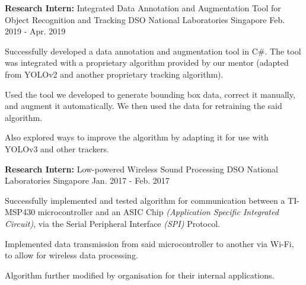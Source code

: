 


\begin{cventries}


\label{computerVisionProject}

\cventry
{
	\textbf{Research Intern:} Integrated Data Annotation and Augmentation Tool for Object Recognition and Tracking
} %
{DSO National Laboratories} %
{Singapore} %
{Feb. 2019 - Apr. 2019} %
{ %
	\begin{cvitems}
		\item { Successfully developed a data annotation and augmentation tool in C\#. The tool was integrated with a proprietary algorithm provided by our mentor (adapted from YOLOv2 and another proprietary tracking algorithm).}
		\item { Used the tool we developed to generate bounding box data, correct it manually, and augment it automatically. We then used the data for retraining the said algorithm.}
		\item { Also explored ways to improve the algorithm by adapting it for use with YOLOv3 and other trackers.}
	\end{cvitems}
}


\cventry
{\textbf{Research Intern:} Low-powered Wireless Sound Processing
} %
{DSO National Laboratories} %
{Singapore} %
{Jan. 2017 - Feb. 2017} %
{ %
\begin{cvitems}
	\item { Successfully implemented and tested algorithm for communication between a TI-MSP430 microcontroller and an ASIC Chip \textit{(Application Specific Integrated Circuit)}, via the Serial Peripheral Interface \textit{(SPI)} Protocol. }
	\item { Implemented data transmission from said microcontroller to another via Wi-Fi, to allow for wireless data processing. }
	\item { Algorithm further modified by organisation for their internal applications. }
\end{cvitems}
}


\end{cventries}
